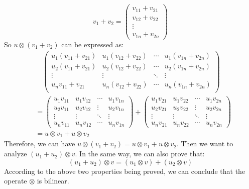 \documentclass[12pt, a4paper]{article}
\begin{document}
\begin{enumerate}
$$          v_1 + v_2 = \begin{pmatrix} v_{11} + v_{21}\\ v_{12} + v_{22}\\ \vdots \\ v_{1n} + v_{2n} \end{pmatrix}
          $$
          So $u \otimes (v_1 + v_2)$ can be expressed as:
          \begin{align*}
              &\quad 
              \begin{pmatrix}
                  u_1(v_{11} + v_{21}) & u_1(v_{12} + v_{22}) & \cdots & u_1(v_{1n} + v_{2n})\\
                  u_2(v_{11} + v_{21}) & u_2(v_{12} + v_{22}) & \cdots & u_2(v_{1n} + v_{2n})\\
                  \vdots & \vdots & \ddots & \vdots\\
                  u_n{v_{11} + v_{21}} & u_n(v_{12} + v_{22}) & \cdots & u_n(v_{1n} + v_{2n})\\
              \end{pmatrix}\\
              &= \begin{pmatrix}
                  u_1v_{11} & u_1v_{12} & \cdots & u_1v_{1n}\\
                  u_2v_{11} & u_2v_{12} & \vdots & u_2v_{1n}\\
                  \vdots & \vdots & \ddots & \vdots\\
                  u_nv_{11} & u_nv_{12} & \cdots & u_nv_{1n} 
              \end{pmatrix} + 
              \begin{pmatrix}
                u_1v_{21} & u_1v_{22} & \cdots & u_1v_{2n}\\
                u_2v_{21} & u_2v_{22} & \vdots & u_2v_{2n}\\
                \vdots & \vdots & \ddots & \vdots\\
                u_nv_{21} & u_nv_{22} & \cdots & u_nv_{2n}
              \end{pmatrix}\\
              &= u\otimes v_1 + u\otimes v_2
          \end{align*}
          Therefore, we can have $u \otimes (v_1 + v_2) = u\otimes v_1 + u\otimes v_2$. 
          Then we want to analyze $(u_1 + u_2) \otimes v$. In the same way, we can also prove that: 
          $$(u_1 + u_2) \otimes v = (u_1\otimes v) + (u_2\otimes v)$$
          According to the above two properties being proved, we can conclude that the operate $\otimes$ is bilinear.
          
        
\end{enumerate}
\end{document}
